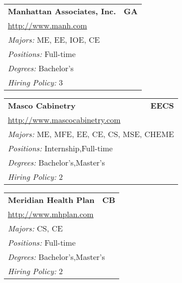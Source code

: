 \documentclass[twoside]{article}
\begin{document}
\begin{center}
\begin{multicols}{3}
\begin{FlushLeft}
\begin{minipage}{.9\columnwidth}
\end{minipage}
 
\begin{minipage}{.9\columnwidth}\begin{tabularx}{.95\columnwidth}{Xr}
                 {\Large\bf Manhattan Associates, Inc.} & {\Large\bf GA}\\
    \multicolumn{2}{p{.95\columnwidth}}{\url{http://www.manh.com}}\\
    \multicolumn{2}{p{.95\columnwidth}}{\emph{Majors:} ME, EE, IOE, CE}\\
    \multicolumn{2}{p{.95\columnwidth}}{\emph{Positions:} Full-time}\\
    \multicolumn{2}{p{.95\columnwidth}}{\emph{Degrees:} Bachelor's}\\
    \multicolumn{2}{p{.95\columnwidth}}{\emph{Hiring Policy:} 3}\\
    \end{tabularx}
    
\end{minipage}
 
\begin{minipage}{.9\columnwidth}\begin{tabularx}{.95\columnwidth}{Xr}
                 {\Large\bf Masco Cabinetry} & {\Large\bf EECS}\\
    \multicolumn{2}{p{.95\columnwidth}}{\url{http://www.mascocabinetry.com}}\\
    \multicolumn{2}{p{.95\columnwidth}}{\emph{Majors:} ME, MFE, EE, CE, CS, MSE, CHEME}\\
    \multicolumn{2}{p{.95\columnwidth}}{\emph{Positions:} Internship,Full-time}\\
    \multicolumn{2}{p{.95\columnwidth}}{\emph{Degrees:} Bachelor's,Master's}\\
    \multicolumn{2}{p{.95\columnwidth}}{\emph{Hiring Policy:} 2}\\
    \end{tabularx}
    
\end{minipage}
 
\begin{minipage}{.9\columnwidth}\begin{tabularx}{.95\columnwidth}{Xr}
                 {\Large\bf Meridian Health Plan} & {\Large\bf CB}\\
    \multicolumn{2}{p{.95\columnwidth}}{\url{http://www.mhplan.com}}\\
    \multicolumn{2}{p{.95\columnwidth}}{\emph{Majors:} CS, CE}\\
    \multicolumn{2}{p{.95\columnwidth}}{\emph{Positions:} Full-time}\\
    \multicolumn{2}{p{.95\columnwidth}}{\emph{Degrees:} Bachelor's,Master's}\\
    \multicolumn{2}{p{.95\columnwidth}}{\emph{Hiring Policy:} 2}\\
    \end{tabularx}
    

\end{minipage}
\end{FlushLeft}
\end{multicols}
\end{center}
\end{document}
